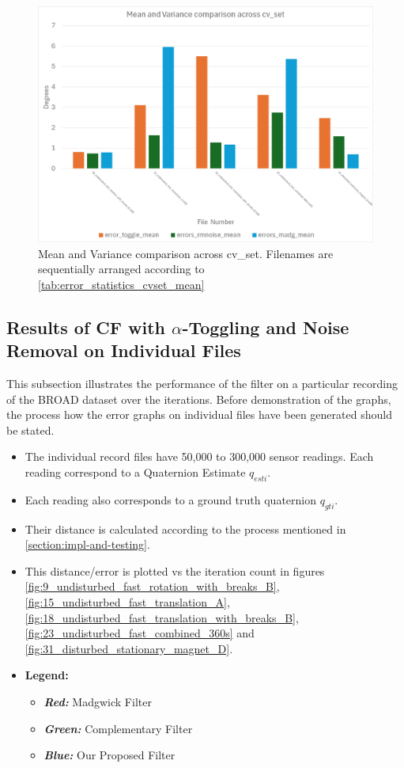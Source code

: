 \documentclass{iutbscthesis}
\begin{document}
\begin{figure}[H]
    \centering
    \includegraphics[width=0.75\linewidth]{figures/rmnoise_chart.png}
    \caption{Mean and Variance comparison across cv\_set. Filenames are sequentially arranged according to \autoref{tab:error_statistics_cvset_mean}}
    \label{fig:chart_rmnoise_comparison}
\end{figure}


\subsection{Results of CF with $\alpha$-Toggling and Noise Removal on Individual Files} \label{subsec:individualFiles}
This subsection illustrates the performance of the filter on a particular recording of the BROAD dataset over the iterations. Before demonstration of the graphs, the process how the error graphs on individual files have been generated should be stated.
\begin{itemize}
    \item The individual record files have 50,000 to 300,000 sensor readings. Each reading correspond to a Quaternion Estimate $q_{esti}$.
    \item Each reading also corresponds to a ground truth quaternion $q_{gti}$.
    \item Their distance is calculated according to the process mentioned in \autoref{section:impl-and-testing}.
    \item This distance/error is plotted vs the iteration count in figures \ref{fig:9_undisturbed_fast_rotation_with_breaks_B},\ref{fig:15_undisturbed_fast_translation_A},\ref{fig:18_undisturbed_fast_translation_with_breaks_B},\ref{fig:23_undisturbed_fast_combined_360s} and \ref{fig:31_disturbed_stationary_magnet_D}.
    \item \textbf{Legend:}
    \begin{itemize}
        \item \textit{\textbf{Red:}} Madgwick Filter
        \item \textit{\textbf{Green:}} Complementary Filter
        \item \textit{\textbf{Blue:}} Our Proposed Filter
    \end{itemize}
\end{itemize}
\end{document}
